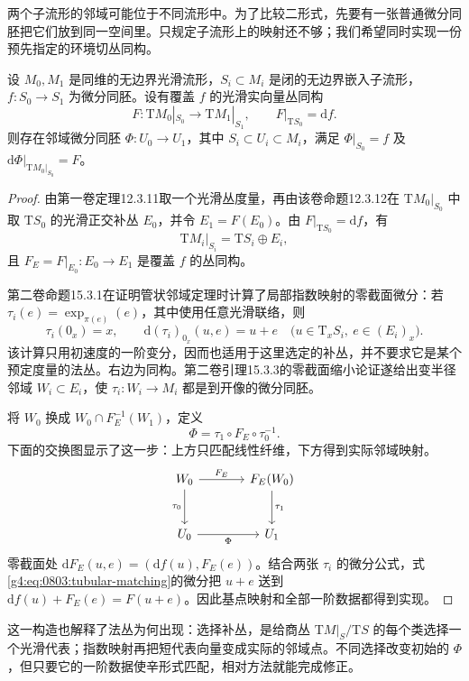 两个子流形的邻域可能位于不同流形中。为了比较二形式，先要有一张普通微分同胚把它们放到同一空间里。只规定子流形上的映射还不够；我们希望同时实现一份预先指定的环境切丛同构。

\begin{lemma}\label{g4:lem:0803:realize-first-jet}
	设 \(M_0,M_1\) 是同维的无边界光滑流形，\(S_i\subset M_i\) 是闭的无边界嵌入子流形，\(f:S_0\to S_1\) 为微分同胚。设有覆盖 \(f\) 的光滑实向量丛同构
	\[
		F:\mathrm{T}M_0|_{S_0}\longrightarrow\mathrm{T}M_1|_{S_1},
		\qquad F|_{\mathrm{T}S_0}=\mathrm{d}f.
	\]
	则存在邻域微分同胚 \(\Phi:U_0\to U_1\)，其中 \(S_i\subset U_i\subset M_i\)，满足 \(\Phi|_{S_0}=f\) 及 \(\mathrm{d}\Phi|_{\mathrm{T}M_0|_{S_0}}=F\)。
\end{lemma}
\begin{proof}
	由第一卷定理12.3.11取一个光滑丛度量，再由该卷命题12.3.12在 \(\mathrm{T}M_0|_{S_0}\) 中取 \(\mathrm{T}S_0\) 的光滑正交补丛 \(E_0\)，并令 \(E_1=F(E_0)\)。由 \(F|_{\mathrm{T}S_0}=\mathrm{d}f\)，有
	\[
		\mathrm{T}M_i|_{S_i}=\mathrm{T}S_i\oplus E_i,
	\]
	且 \(F_E=F|_{E_0}:E_0\to E_1\) 是覆盖 \(f\) 的丛同构。

	第二卷命题15.3.1在证明管状邻域定理时计算了局部指数映射的零截面微分：若 \(\tau_i(e)=\exp_{\pi(e)}(e)\)，其中使用任意光滑联络，则
	\[
		\tau_i(0_x)=x,\qquad
		\mathrm{d}(\tau_i)_{0_x}(u,e)=u+e
		\quad\bigl(u\in\mathrm{T}_xS_i,\ e\in(E_i)_x\bigr).
	\]
	该计算只用初速度的一阶变分，因而也适用于这里选定的补丛，并不要求它是某个预定度量的法丛。右边为同构。第二卷引理15.3.3的零截面缩小论证遂给出变半径邻域 \(W_i\subset E_i\)，使 \(\tau_i:W_i\to M_i\) 都是到开像的微分同胚。

	将 \(W_0\) 换成 \(W_0\cap F_E^{-1}(W_1)\)，定义
	\begin{equation}\label{g4:eq:0803:tubular-matching}
		\Phi=\tau_1\circ F_E\circ\tau_0^{-1}.
	\end{equation}
	下面的交换图显示了这一步：上方只匹配线性纤维，下方得到实际邻域映射。
	\[
		\begin{tikzcd}[column sep=large,row sep=large]
			W_0 \arrow[r,"F_E"] \arrow[d,"\tau_0"'] & F_E(W_0) \arrow[d,"\tau_1"] \\
			U_0 \arrow[r,"\Phi"'] & U_1
		\end{tikzcd}
	\]
	零截面处 \(\mathrm{d}F_E(u,e)=(\mathrm{d}f(u),F_E(e))\)。结合两张 \(\tau_i\) 的微分公式，式\eqref{g4:eq:0803:tubular-matching}的微分把 \(u+e\) 送到 \(\mathrm{d}f(u)+F_E(e)=F(u+e)\)。因此基点映射和全部一阶数据都得到实现。
\end{proof}

这一构造也解释了法丛为何出现：选择补丛，是给商丛 \(\mathrm{T}M|_S/\mathrm{T}S\) 的每个类选择一个光滑代表；指数映射再把短代表向量变成实际的邻域点。不同选择改变初始的 \(\Phi\)，但只要它的一阶数据使辛形式匹配，相对方法就能完成修正。


